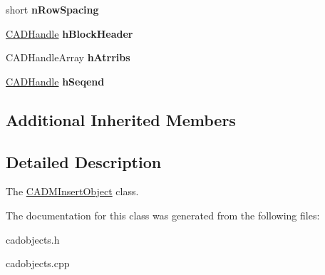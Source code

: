 \begin{DoxyCompactItemize}
\item 
short {\bfseries n\+Row\+Spacing}\hypertarget{class_c_a_d_m_insert_object_ab89dd6e7dcde3f3148e86aaf5bded2c5}{}\label{class_c_a_d_m_insert_object_ab89dd6e7dcde3f3148e86aaf5bded2c5}

\item 
\hyperlink{class_c_a_d_handle}{C\+A\+D\+Handle} {\bfseries h\+Block\+Header}\hypertarget{class_c_a_d_m_insert_object_a75ad8b3bf7a466a5a1050747627e808f}{}\label{class_c_a_d_m_insert_object_a75ad8b3bf7a466a5a1050747627e808f}

\item 
C\+A\+D\+Handle\+Array {\bfseries h\+Atrribs}\hypertarget{class_c_a_d_m_insert_object_ac77bf3fd0f32c983366577e823025053}{}\label{class_c_a_d_m_insert_object_ac77bf3fd0f32c983366577e823025053}

\item 
\hyperlink{class_c_a_d_handle}{C\+A\+D\+Handle} {\bfseries h\+Seqend}\hypertarget{class_c_a_d_m_insert_object_a1c7817910374d5ba23c22cafa9745cf7}{}\label{class_c_a_d_m_insert_object_a1c7817910374d5ba23c22cafa9745cf7}

\end{DoxyCompactItemize}
\subsection*{Additional Inherited Members}


\subsection{Detailed Description}
The \hyperlink{class_c_a_d_m_insert_object}{C\+A\+D\+M\+Insert\+Object} class. 

The documentation for this class was generated from the following files\+:\begin{DoxyCompactItemize}
\item 
cadobjects.\+h\item 
cadobjects.\+cpp\end{DoxyCompactItemize}
